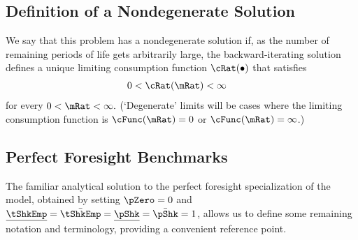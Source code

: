 \documentclass[BufferStockTheory]{subfiles}
\begin{document}
\hypertarget{Definition-of-a-Nondegenerate-Solution}{}
\subsection{Definition of a Nondegenerate Solution}

We say that this problem has a nondegenerate solution if, as the number of remaining periods of life gets arbitrarily large, the backward-iterating solution defines a unique limiting consumption function $\cRat(\bullet)$ that satisfies
\begin{equation}\begin{gathered}\begin{aligned}
  0 & < \cRat(\mRat) <  \infty 
\end{aligned}\end{gathered}\end{equation}
for every $0 < \mRat < \infty.$ (`Degenerate' limits will be cases
where the limiting consumption function is $\cFunc(\mRat)=0$ or $\cFunc(\mRat)=\infty$.)

\hypertarget{Perfect-Foresight-Benchmarks}{}
\subsection{Perfect Foresight Benchmarks}

The familiar analytical solution to the perfect foresight specialization of the model, obtained by setting $\pZero=0$ and $\underline{\tShkEmp}=\bar{\tShkEmp}=\underline{\pShk}=\bar{\pShk}=1$, allows us to define some remaining notation and terminology, providing a convenient reference point.

\hypertarget{Human-Wealth}{}
\end{document}
